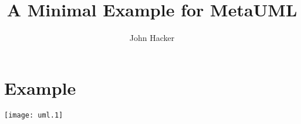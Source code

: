 \documentclass{article}
\title{A Minimal Example for MetaUML}
\author{John Hacker}
\begin{document}
\maketitle

\section{Example}
\texttt{[image: uml.1]}
\end{document}
